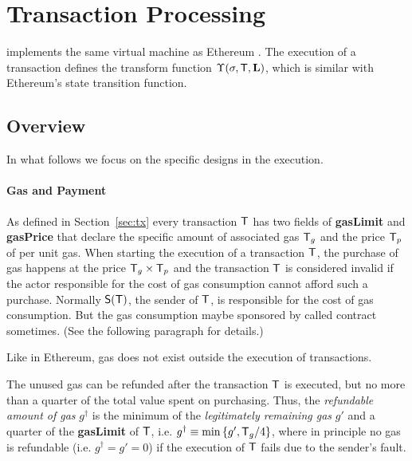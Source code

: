 

\section{Transaction Processing}
\label{sec:tx_processing}

\name implements the same virtual machine as Ethereum \cite{ETH_yellow}. 
The execution of a transaction defines the transform function $\Upsilon(\mathbf{\sigma},\textsf{T},\mathbf{L})$, which is similar with Ethereum's state transition function.

\subsection{Overview}

In what follows we focus on the \name specific designs in the execution.

\paragraph{Gas and Payment}\label{subsec:gas_and_pay}

As defined in Section~\ref{sec:tx} every transaction $\textsf{T}$ has two fields of {\bf gasLimit} and {\bf gasPrice} that declare the specific amount of associated gas $\textsf{T}_g$ and the price $\textsf{T}_p$ of per unit gas.
When starting the execution of a transaction $\textsf{T}$, the purchase of gas happens at the price $\textsf{T}_g \times \textsf{T}_p$ and the transaction $\textsf{T}$ is considered invalid if the actor responsible for the cost of gas consumption cannot afford such a purchase.
Normally $\mathsf{S}{\left({\textsf{T}} \right)}$, the sender of $\textsf{T}$, is responsible for the cost of gas consumption. But the gas consumption maybe sponsored by called contract sometimes. (See the following paragraph for details.)

Like in Ethereum, gas does not exist outside the execution of transactions.

The unused gas can be refunded after the transaction $\textsf{T}$ is executed, but no more than a quarter of the total value spent on purchasing. 
Thus, the \emph{refundable amount of gas} $g^{\dagger}$ is the minimum of the \emph{legitimately remaining gas} $g'$ and a quarter of the \textbf{gasLimit} of $\textsf{T}$,
i.e. $g^{\dagger}\equiv \min{\left \{{g', \textsf{T}_g/4} \right \}}$, 
where in principle no gas is refundable (i.e. $g^{\dagger} = g' = 0$) if the execution of $\textsf{T}$ fails due to the sender's fault. 

